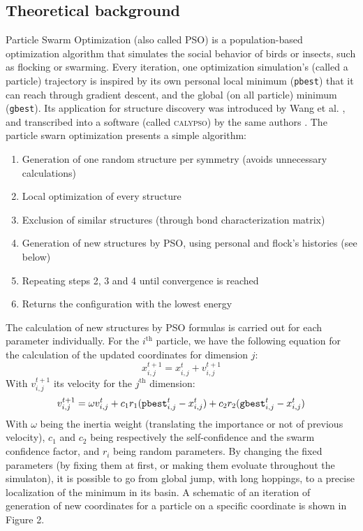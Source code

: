 \documentclass[11pt]{article}
\begin{document}
\begin{multicols}{2}
\subsection*{Theoretical background}
Particle Swarm Optimization (also called PSO) is a population-based optimization algorithm that simulates the social behavior of birds or insects, such as flocking or swarming. Every iteration, one optimization simulation's (called a particle) trajectory is inspired by its own personal local minimum (\verb+pbest+) that it can reach through gradient descent, and the global (on all particle) minimum (\verb+gbest+). Its application for structure discovery was introduced by Wang et al. \cite{PhysRevB.82.094116}, and transcribed into a software (called \textsc{calypso}) by the same authors \cite{WANG20122063}. The particle swarn optimization presents a simple algorithm:
\begin{enumerate}
\itemsep0em
    \item Generation of one random structure per symmetry (avoids unnecessary calculations)
    \item Local optimization of every structure
    \item Exclusion of similar structures (through bond characterization matrix)
    \item Generation of new structures by PSO, using personal and flock's histories (see below)
    \item Repeating steps 2, 3 and 4 until convergence is reached
    \item Returns the configuration with the lowest energy
\end{enumerate}
The calculation of new structures by PSO formulas is carried out for each parameter individually.
For the $i^\text{th}$ particle, we have the following equation for the calculation of the updated coordinates for dimension $j$:
\begin{equation}
    x_{i,j}^{t+1}=x_{i,j}^{t}+v_{i,j}^{t+1}
\end{equation}
With $v_{i,j}^{t+1}$ its velocity for the $j^\text{th}$ dimension:
\begin{equation}
    v_{i,j}^{t+1}=\omega v_{i,j}^t+c_1r_1(\verb+pbest+_{i,j}^t-x_{i,j}^t)+c_2r_2(\verb+gbest+_{i,j}^t-x_{i,j}^t)
\end{equation}
With $\omega$ being the inertia weight (translating the importance or not of previous velocity), $c_1$ and $c_2$ being respectively the self-confidence and the swarm confidence factor, and $r_i$ being random parameters. By changing the fixed parameters (by fixing them at first, or making them evoluate throughout the simulaton), it is possible to go from global jump, with long hoppings, to a precise localization of the minimum in its basin.
A schematic of an iteration of generation of new coordinates for a particle on a specific coordinate is shown in Figure 2. 
\bigskip


\end{multicols}
\end{document}
